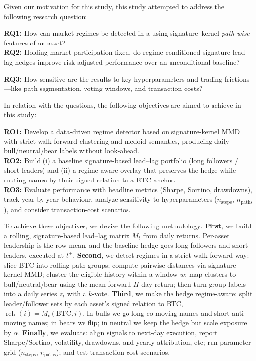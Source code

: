 Given our motivation for this study, this study attempted to address the following research question:

\noindent\textbf{RQ1:} How can market regimes be detected in a using signature–kernel \emph{path-wise} features of an asset?\\
\noindent\textbf{RQ2:} Holding market participation fixed, do regime-conditioned signature lead–lag hedges improve risk-adjusted performance over an unconditional baseline? 

\noindent\textbf{RQ3:} How sensitive are the results to key hyperparameters and trading frictions—like path segmentation, voting windows, and transaction costs?

In relation with the questions, the following objectives are aimed to achieve in this study:

\noindent\textbf{RO1:} Develop a data-driven regime detector based on signature-kernel MMD with strict walk-forward clustering and medoid semantics, producing daily bull/neutral/bear labels without look-ahead.\\
\noindent\textbf{RO2:} Build (i) a baseline signature-based lead–lag portfolio (long followers / short leaders) and (ii) a regime-aware overlay that preserves the hedge while routing names by their signed relation to a BTC anchor.\\
\textbf{RO3:} Evaluate performance with headline metrics (Sharpe, Sortino, drawdowns), track year-by-year behaviour, analyze sensitivity to hyperparameters ($n_{\text{steps}}$, $n_{\text{paths}}$), and consider transaction-cost scenarios.


To achieve these objectives, we devise the following methodology: \textbf{First}, we build a rolling, signature-based lead--lag matrix $M_t$ from daily returns. Per-asset leadership is the row mean, and the baseline hedge goes long followers and short leaders, executed at $t^+$.
\textbf{Second}, we detect regimes in a strict walk-forward way: slice BTC into rolling path groups; compute pairwise distances via signature-kernel MMD; cluster the eligible history within a window $w$; map clusters to bull/neutral/bear using the mean forward $H$-day return; then turn group labels into a daily series $z_t$ with a $k$-vote.
\textbf{Third}, we make the hedge regime-aware: split leader/follower sets by each asset’s signed relation to BTC, $\operatorname{rel}_t(i)=M_t(\mathrm{BTC}, i)$. In bulls we go long co-moving names and short anti-moving names; in bears we flip; in neutral we keep the hedge but scale exposure by $\alpha$.
\textbf{Finally}, we evaluate: align signals to next-day execution, report Sharpe/Sortino, volatility, drawdowns, and yearly attribution, etc; run parameter grid ($n_{\text{steps}}$, $n_{\text{paths}}$); and test transaction-cost scenarios.



